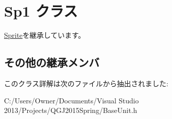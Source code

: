 \hypertarget{class_sp1}{}\section{Sp1 クラス}
\label{class_sp1}


\hyperlink{class_sprite}{Sprite}を継承しています。

\subsection*{その他の継承メンバ}


このクラス詳解は次のファイルから抽出されました\+:\begin{DoxyCompactItemize}
\item 
C\+:/\+Users/\+Owner/\+Documents/\+Visual Studio 2013/\+Projects/\+Q\+G\+J2015\+Spring/Base\+Unit.\+h\end{DoxyCompactItemize}
